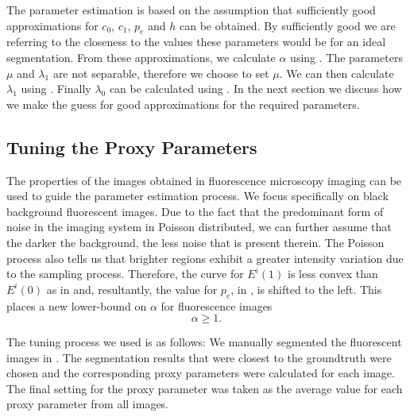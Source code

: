 \documentclass[10pt, journal, letterpaper, onecolumn, draftcls]{IEEEtran}
\begin{document}
The parameter estimation is based on the assumption that sufficiently good approximations for $c_0$, $c_1$, $p_e$ and $h$ can be obtained. By sufficiently good we are referring to the closeness to the values these parameters would be for an ideal segmentation. From these approximations, we calculate $\alpha$ using . The parameters $\mu$ and $\lambda_1$ are not separable, therefore we choose to set $\mu$. We can then calculate $\lambda_1$ using . Finally $\lambda_0$ can be calculated using . In the next section we discuss how we make the guess for good approximations for the required parameters.

\subsection{Tuning the Proxy Parameters}
The properties of the images obtained in fluorescence microscopy imaging can be used to guide the parameter estimation process. We focus specifically on black background fluorescent images. Due to the fact that the predominant form of noise in the imaging system in Poisson distributed, we can further assume that the darker the background, the less noise that is present therein. The Poisson process also tells us that brighter regions exhibit a greater intensity variation due to the sampling process. Therefore, the curve for $E^i(1)$ is less convex than $E^i(0)$ as in  and, resultantly, the value for $p_e$, in , is shifted to the left. This places a new lower-bound on $\alpha$ for fluorescence images
\begin{equation}
	\alpha \geq 1.
	\label{eq:alphalowerboundFM}
\end{equation}

The tuning process we used is as follows:
We manually segmented the fluorescent images in . The segmentation results that were closest to the groundtruth were chosen and the corresponding proxy parameters were calculated for each image. The final setting for the proxy parameter was taken as the average value for each proxy parameter from all images. 
\end{document}
